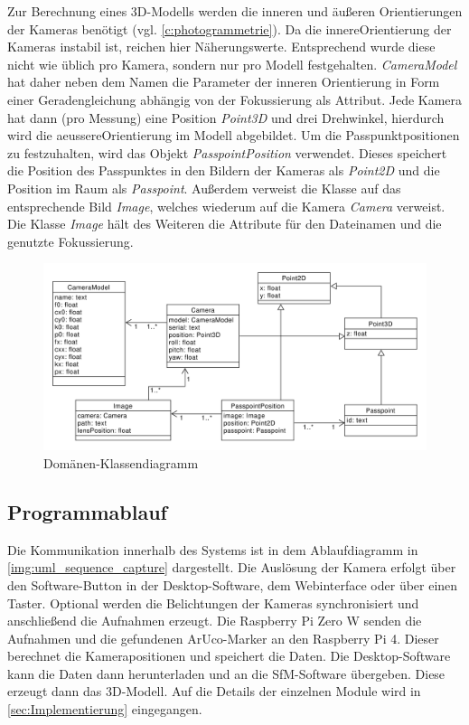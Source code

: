 \documentclass[./00PhotoBox.tex]{subfiles}
\begin{document}
Zur Berechnung eines 3D-Modells werden die inneren und äußeren Orientierungen der Kameras benötigt (vgl. \autoref{c:photogrammetrie}). Da die \gls{innereOrientierung} der Kameras instabil ist, reichen hier Näherungswerte. Entsprechend wurde diese nicht wie üblich pro Kamera, sondern nur pro Modell festgehalten. \textit{CameraModel} hat daher neben dem Namen die Parameter der inneren Orientierung in Form einer Geradengleichung abhängig von der Fokussierung als Attribut. Jede Kamera hat dann (pro Messung) eine Position  \textit{Point3D} und drei Drehwinkel, hierdurch wird die \gls{aeussereOrientierung} im Modell abgebildet. Um die Passpunktpositionen zu festzuhalten, wird das Objekt \textit{PasspointPosition} verwendet. Dieses speichert die Position des Passpunktes in den Bildern der Kameras als \textit{Point2D} und die Position im Raum als \textit{Passpoint}. Außerdem verweist die Klasse auf das entsprechende Bild \textit{Image}, welches wiederum auf die Kamera \textit{Camera} verweist. Die Klasse \textit{Image} hält des Weiteren die Attribute für den Dateinamen und die genutzte Fokussierung.

\begin{figure}
    \centering
    \includegraphics[width=1\textwidth]{./img/uml/uml_domain.pdf}
    \caption{Domänen-Klassendiagramm} %
    \label{img:dokladia} %
\end{figure}

\subsection{Programmablauf}
Die Kommunikation innerhalb des Systems ist in dem Ablaufdiagramm in \autoref{img:uml_sequence_capture} dargestellt. Die Auslösung der Kamera erfolgt über den Software-Button in der Desktop-Software, dem Webinterface oder über einen Taster. Optional werden die Belichtungen der Kameras synchronisiert und anschließend die Aufnahmen erzeugt. Die Raspberry Pi Zero W senden die Aufnahmen und die gefundenen ArUco-Marker an den Raspberry Pi 4. Dieser berechnet die Kamerapositionen und speichert die Daten. Die Desktop-Software kann die Daten dann herunterladen und an die \Gls{SfM}-Software übergeben. Diese erzeugt dann das 3D-Modell. Auf die Details der einzelnen Module wird in \autoref{sec:Implementierung} eingegangen.
\end{document}
